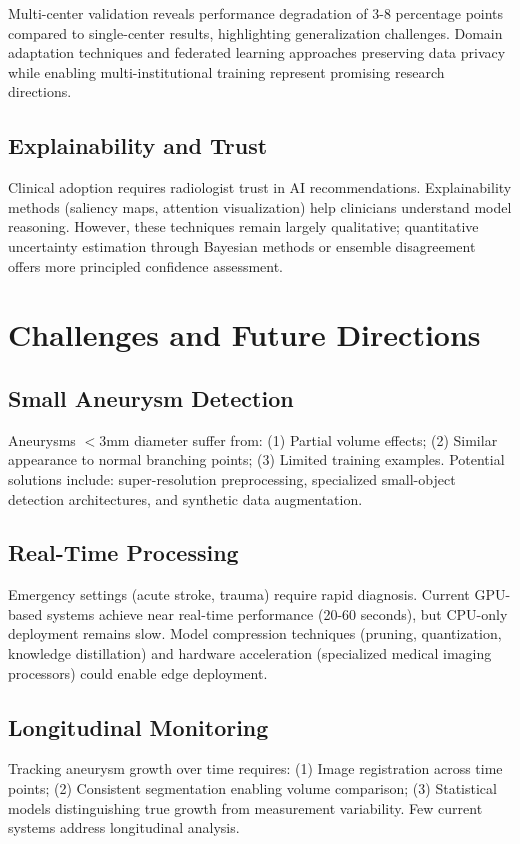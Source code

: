 \documentclass[conference]{IEEEtran}
\begin{document}
Multi-center validation reveals performance degradation of 3-8 percentage points compared to single-center results, highlighting generalization challenges. Domain adaptation techniques and federated learning approaches preserving data privacy while enabling multi-institutional training represent promising research directions.

\subsection{Explainability and Trust}

Clinical adoption requires radiologist trust in AI recommendations. Explainability methods (saliency maps, attention visualization) help clinicians understand model reasoning. However, these techniques remain largely qualitative; quantitative uncertainty estimation through Bayesian methods or ensemble disagreement offers more principled confidence assessment.

\section{Challenges and Future Directions}

\subsection{Small Aneurysm Detection}
Aneurysms $<$3mm diameter suffer from: (1) Partial volume effects; (2) Similar appearance to normal branching points; (3) Limited training examples. Potential solutions include: super-resolution preprocessing, specialized small-object detection architectures, and synthetic data augmentation.

\subsection{Real-Time Processing}
Emergency settings (acute stroke, trauma) require rapid diagnosis. Current GPU-based systems achieve near real-time performance (20-60 seconds), but CPU-only deployment remains slow. Model compression techniques (pruning, quantization, knowledge distillation) and hardware acceleration (specialized medical imaging processors) could enable edge deployment.

\subsection{Longitudinal Monitoring}
Tracking aneurysm growth over time requires: (1) Image registration across time points; (2) Consistent segmentation enabling volume comparison; (3) Statistical models distinguishing true growth from measurement variability. Few current systems address longitudinal analysis.
\end{document}
